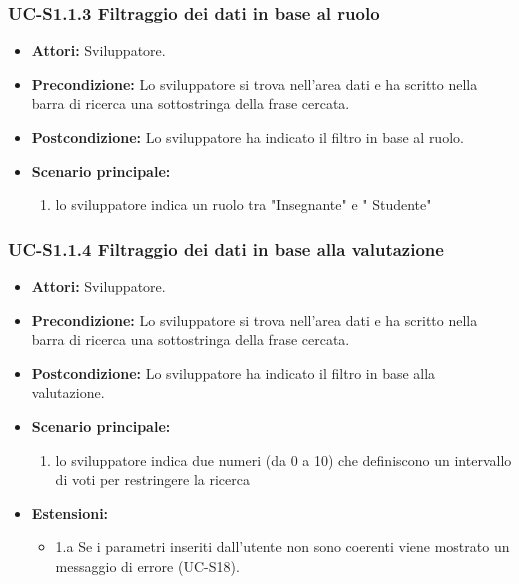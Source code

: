 	\subsubsection{UC-S1.1.3 Filtraggio dei dati in base al ruolo}	
		\begin{itemize}
			\item \textbf{Attori:} Sviluppatore.
			\item \textbf{Precondizione:} Lo sviluppatore si trova nell'area dati e ha scritto nella barra di ricerca una sottostringa della frase cercata.
			\item \textbf{Postcondizione:} Lo sviluppatore ha indicato il filtro in base al ruolo.
			\item \textbf{Scenario principale:}
				\begin{enumerate}
					\item lo sviluppatore indica un ruolo tra "Insegnante" e " Studente"
				\end{enumerate}
		\end{itemize}

	\subsubsection{UC-S1.1.4 Filtraggio dei dati in base alla valutazione}	
		\begin{itemize}
			\item \textbf{Attori:} Sviluppatore.
			\item \textbf{Precondizione:} Lo sviluppatore si trova nell'area dati e ha scritto nella barra di ricerca una sottostringa della frase cercata.
			\item \textbf{Postcondizione:} Lo sviluppatore ha indicato il filtro in base alla valutazione.
			\item \textbf{Scenario principale:}
				\begin{enumerate}
					\item lo sviluppatore indica due numeri (da 0 a 10) che definiscono un intervallo di voti per restringere la ricerca
				\end{enumerate}
			\item \textbf{Estensioni:}
				\begin{itemize}
					\item 1.a Se i parametri inseriti dall'utente non sono coerenti viene mostrato un messaggio di errore (UC-S18).
				\end{itemize}
		\end{itemize}	
	
